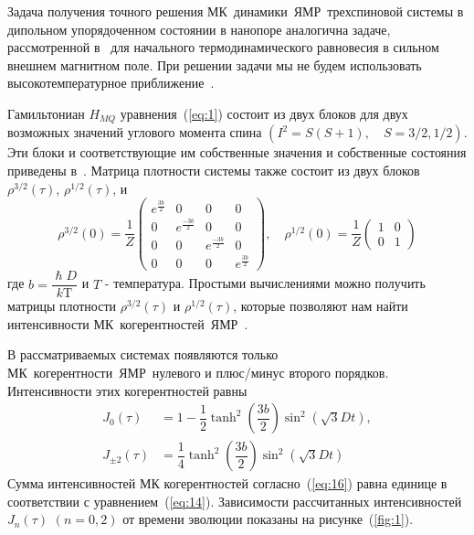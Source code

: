\documentclass[utf8]{jetp}
\begin{document}
Задача получения точного решения МК~динамики~ЯМР~трехспиновой системы в дипольном упорядоченном состоянии в нанопоре аналогична задаче, рассмотренной в~\cite{Doronin_2019} для начального термодинамического равновесия в сильном внешнем магнитном поле.
При решении задачи мы не будем  использовать высокотемпературное приближение~\cite{Goldman_1970}.

Гамильтониан $H_{MQ}$ уравнения~(\ref{eq:1}) состоит из двух блоков для двух возможных значений углового момента спина $(I^2 = S(S+1), \quad S=3/2,1/2)$.
Эти блоки и соответствующие им собственные значения и собственные состояния приведены в~\cite{Doronin_2019}.
Матрица плотности системы также состоит из двух блоков $\rho^{3/2}(\tau)$, $\rho^{1/2}(\tau)$, и
%
\begin{equation}
  \label{eq:15}
  \rho^{3/2}(0) = \dfrac 1 Z
  \begin{pmatrix}
    e^{\frac{3b}{2}} & 0 & 0 & 0
    \\
    0 & e^{\frac{-3b}{2}} & 0 & 0
    \\
    0 & 0 & e^{\frac{-3b}{2}} & 0
    \\
    0 & 0 & 0 & e^{\frac{3b}{2}}
  \end{pmatrix},
  \quad
  \rho^{1/2}(0) = \dfrac 1 Z
  \begin{pmatrix}
    	1 & 0
    \\
    0 & 1
  \end{pmatrix}
\end{equation}
%
где $b = \dfrac{\hslash D}{k\mathrm{T}}$ и $T$ - температура.
Простыми вычислениями можно получить матрицы плотности $\rho^{3/2}(\tau)$ и $\rho^{1/2}(\tau)$,
которые позволяют нам найти интенсивности МК~когерентностей~ЯМР~.

В рассматриваемых системах появляются только МК~когерентности~ЯМР~нулевого и плюс/минус второго порядков.
Интенсивности этих когерентностей равны
%
\begin{equation}
  \begin{split}
    \label{eq:16}
    J_0(\tau) & = 1
    - \dfrac 1 2 \tanh^2\left( \dfrac{3b}{2} \right)
      \sin^2 \left( \sqrt{3} Dt \right),
    \\
    J_{\pm2}(\tau) & = \dfrac{1}{4}
      \tanh^2 \left( \dfrac{3b}{2} \right)
      \sin^2 \left( \sqrt{3} Dt \right)
  \end{split}
\end{equation}
%
Сумма интенсивностей МК когерентностей согласно~(\ref{eq:16}) равна единице в соответствии с уравнением~(\ref{eq:14}).
Зависимости рассчитанных интенсивностей $J_{n}(\tau)$ $(n=0,2)$ от времени эволюции показаны на рисунке~(\ref{fig:1}).
\end{document}
